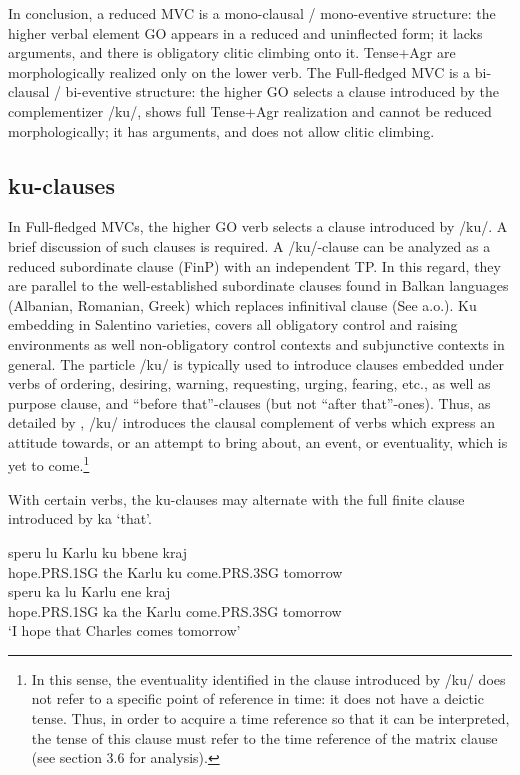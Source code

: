 \documentclass[output=paper]{langscibook}
\begin{document}
In conclusion, a reduced MVC is a mono-clausal / mono-eventive structure: the higher verbal element GO appears in a reduced and uninflected form; it lacks arguments, and there is obligatory clitic climbing onto it.   Tense+Agr are morphologically realized only on the lower verb.  The Full-fledged MVC is a bi-clausal / bi-eventive structure: the higher GO selects a clause introduced by the complementizer /ku/, shows full Tense+Agr realization and cannot be reduced morphologically; it has arguments, and does not allow clitic climbing. 

\subsection{ku-clauses}

In Full-fledged MVCs, the higher GO verb selects a clause introduced by /ku/.  A brief discussion of such clauses is required.  A /ku/-clause can be analyzed as a reduced subordinate clause (FinP) with an independent TP.  In this regard, they are parallel to the well-established subordinate clauses found in Balkan languages (Albanian, Romanian, Greek) which replaces infinitival clause (See \cite{calabrese1993a, rivero1994a, manzini2005a, roberts2003a} a.o.). Ku embedding in Salentino varieties, covers all obligatory control and raising environments as well non-obligatory control contexts and subjunctive contexts in general. The particle /ku/ is typically used to introduce clauses embedded under verbs of ordering, desiring, warning, requesting, urging, fearing, etc., as well as purpose clause, and “before that”-clauses (but not “after that”-ones). Thus, as detailed by \cite{calabrese1993a}, /ku/ introduces the clausal complement of verbs which express an attitude towards, or an attempt to bring about, an event, or eventuality, which is yet to come.\footnote{In this sense, the eventuality identified in the clause introduced by /ku/ does not refer to a specific point of reference in time: it does not have a deictic tense.  Thus, in order to acquire a time reference so that it can be interpreted, the tense of this clause must refer to the time reference of the matrix clause (see section 3.6 for analysis).}

With certain verbs, the ku-clauses may alternate with the full finite clause introduced by ka ‘that’. 

\ea\label{ac11}
    \ea \label{ac11a}\gll speru   lu  Karlu   ku  bbene      kraj \\
       hope.PRS.1SG    the  Karlu   ku  come.PRS.3SG  tomorrow\\
    \ex \label{ac11b}\gll speru       ka   lu  Karlu ene       kraj \\
     hope.PRS.1SG    ka   the  Karlu  come.PRS.3SG  tomorrow\\
   \glt ‘I hope that Charles comes tomorrow’
    \z
\z
\end{document}
